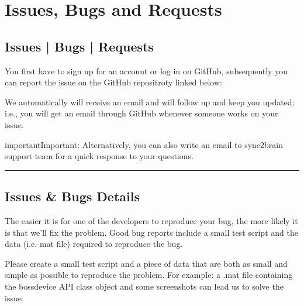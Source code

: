 \documentclass[letterpaper,10pt,english]{sphinxmanual}
\begin{document}
\chapter{Issues, Bugs and Requests}
\label{\detokenize{7_issues_bugs_requests:issues-bugs-and-requests}}\label{\detokenize{7_issues_bugs_requests::doc}}

\section{Issues | Bugs | Requests}
\label{\detokenize{7_issues_bugs_requests:issues-bugs-requests}}
You first have to sign up for an account or log in on GitHub, subsequently you can report the issue on the GitHub repositroty linked below:

\begin{sphinxVerbatim}[commandchars=\\\{\}]
\end{sphinxVerbatim}

We automatically will receive an email and will follow up and keep you updated; i.e., you will get an email through GitHub whenever someone works on your issue.

\begin{sphinxadmonition}{important}{Important:}
Alternatively, you can also write an email to sync2brain support team for a quick response to your questions.
\end{sphinxadmonition}


\bigskip\hrule\bigskip



\section{Issues \& Bugs Details}
\label{\detokenize{7_issues_bugs_requests:issues-bugs-details}}
The easier it is for one of the developers to reproduce your bug, the more likely it is that we’ll fix the problem. Good bug reports include a small test script and the data (i.e. mat file) required to reproduce the bug.

Please create a small test script and a piece of data that are both as small and simple as possible to reproduce the problem. For example: a .mat file containing the bossdevice API class object and some screenshots can lead us to solve the issue.
\end{document}
